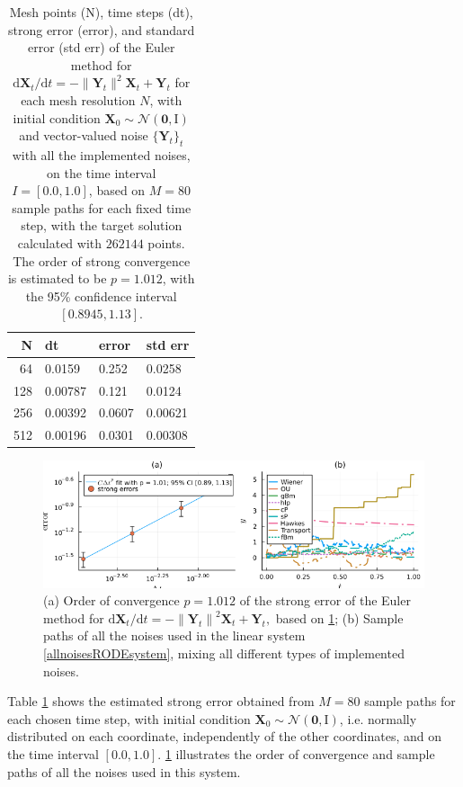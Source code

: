 \documentclass[reqno,12pt]{amsart}
\theoremstyle{plain} %
\theoremstyle{definition} %
\begin{document}
\begin{table}
    \begin{tabular}[htb]{|r|l|l|l|}
        \hline N & dt & error & std err \\
        \hline \hline
        64 & 0.0159 & 0.252 & 0.0258 \\
        128 & 0.00787 & 0.121 & 0.0124 \\
        256 & 0.00392 & 0.0607 & 0.00621 \\
        512 & 0.00196 & 0.0301 & 0.00308 \\
        \hline
    \end{tabular}
    \bigskip

    \caption{Mesh points (N), time steps (dt), strong error (error), and standard error (std err) of the Euler method for $\mathrm{d}\mathbf{X}_t/\mathrm{d}t = - \| \mathbf{Y}_t\|^2 \mathbf{X}_t + \mathbf{Y}_t$ for each mesh resolution $N$, with initial condition $\mathbf{X}_0 \sim \mathcal{N}(\mathbf{0}, \mathrm{I})$ and vector-valued noise $\{\mathbf{Y}_t\}_t$ with all the implemented noises, on the time interval $I = [0.0, 1.0]$, based on $M = 80$ sample paths for each fixed time step, with the target solution calculated with $262144$ points. The order of strong convergence is estimated to be $p = 1.012$, with the 95\% confidence interval $[0.8945, 1.13]$.}
    \label{taballnoises}
\end{table}

\begin{figure}[htb]
    \includegraphics[scale=0.5]{img/allnoises_combined.png}
    \caption{(a) Order of convergence $p = 1.012$ of the strong error of the Euler method for $\mathrm{d}\mathbf{X}_t/\mathrm{d}t = - \left\|\mathbf{Y}_t\right\|^2 \mathbf{X}_t + \mathbf{Y}_t,$ based on \cref{taballnoises}; (b) Sample paths of all the noises used in the linear system \eqref{allnoisesRODEsystem}, mixing all different types of implemented noises.}
    \label{figallnoises}
\end{figure}

Table \ref{taballnoises} shows the estimated strong error obtained from $M = 80$ sample paths for each chosen time step, with initial condition $\mathbf{X}_0 \sim \mathcal{N}(\mathbf{0}, \mathrm{I})$, i.e. normally distributed on each coordinate, independently of the other coordinates, and on the time interval $[0.0, 1.0]$. \cref{figallnoises} illustrates the order of convergence and sample paths of all the noises used in this system.
\end{document}
